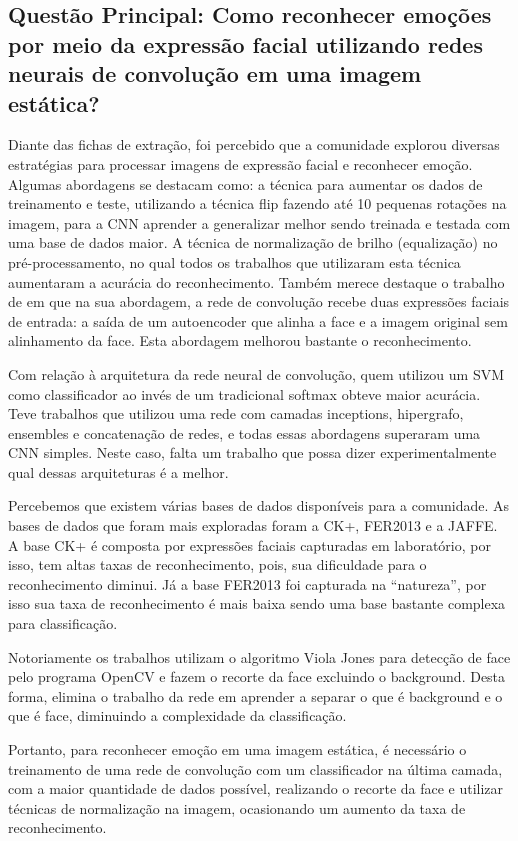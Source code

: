 \subsection{Questão Principal: Como reconhecer emoções por meio da expressão facial utilizando redes neurais de convolução em uma imagem estática?}
Diante das fichas de extração, foi percebido que a comunidade explorou diversas estratégias para processar imagens de expressão facial e reconhecer emoção. Algumas abordagens se destacam como: a técnica para aumentar os dados de treinamento e teste, utilizando a técnica flip fazendo até 10 pequenas rotações na imagem, para a CNN aprender a generalizar melhor sendo treinada e testada com uma base de dados maior. A técnica de normalização de brilho (equalização) no pré-processamento, no qual todos os trabalhos que utilizaram esta técnica aumentaram a acurácia do reconhecimento. Também merece destaque o trabalho de \cite{kim2016fusing} em que na sua abordagem, a rede de convolução recebe duas expressões faciais de entrada: a saída de um autoencoder que alinha a face e a imagem original sem alinhamento da face. Esta abordagem melhorou bastante o reconhecimento.

Com relação à arquitetura da rede neural de convolução, quem utilizou um SVM como classificador ao invés de um tradicional softmax obteve maior acurácia. Teve trabalhos que utilizou uma rede com camadas inceptions, hipergrafo, ensembles e concatenação de redes, e todas essas abordagens superaram uma CNN simples. Neste caso, falta um trabalho que possa dizer experimentalmente qual dessas arquiteturas é a melhor. 

Percebemos que existem várias bases de dados disponíveis para a comunidade. As bases de dados que foram mais exploradas foram a CK+, FER2013 e a JAFFE. A base CK+ é composta por expressões faciais capturadas em laboratório, por isso, tem altas taxas de reconhecimento, pois, sua dificuldade para o reconhecimento diminui. Já a base FER2013 foi capturada na “natureza”, por isso sua taxa de reconhecimento é mais baixa sendo uma base bastante complexa para classificação.

Notoriamente os trabalhos utilizam o algoritmo Viola Jones para detecção de face pelo programa OpenCV e fazem o recorte da face excluindo o background. Desta forma, elimina o trabalho da rede em aprender a separar o que é background e o que é face, diminuindo a complexidade da classificação.

Portanto, para reconhecer emoção em uma imagem estática, é necessário o treinamento de uma rede de convolução com um classificador na última camada, com a maior quantidade de dados possível, realizando o recorte da face e utilizar técnicas de normalização na imagem, ocasionando um aumento da taxa de reconhecimento. 

